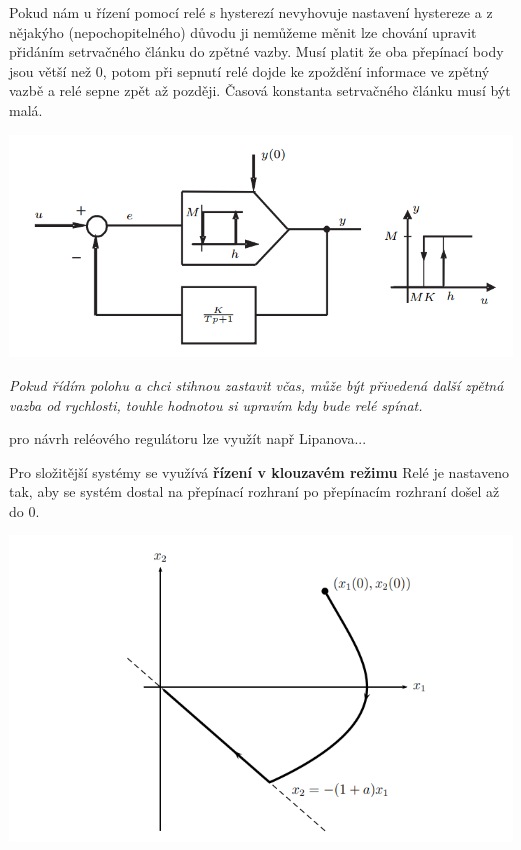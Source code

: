 Pokud nám u řízení pomocí relé s hysterezí nevyhovuje nastavení hystereze a z nějakýho (nepochopitelného) důvodu ji nemůžeme měnit lze chování upravit přidáním setrvačného článku do zpětné vazby.
Musí platit že oba přepínací body jsou větší než 0, potom při sepnutí relé dojde ke zpoždění informace ve zpětný vazbě a relé sepne zpět až později. Časová konstanta setrvačného článku musí být malá.

\includegraphics{img/rele_reg.png}

{ \it
    Pokud řídím polohu a chci stihnou zastavit včas, může být přivedená další zpětná vazba od rychlosti, touhle hodnotou si upravím kdy bude relé spínat.
}

pro návrh reléového regulátoru lze využít např Lipanova...

Pro složitější systémy se využívá {\bf řízení v klouzavém režimu}
Relé je nastaveno tak, aby se systém dostal na přepínací rozhraní  po přepínacím rozhraní došel až do 0.

\includegraphics{img/kluzavy_obr.png}

